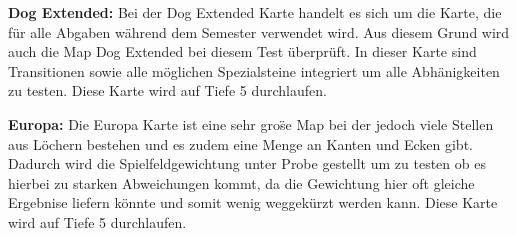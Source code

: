 \textbf{Dog Extended:}
Bei der Dog Extended Karte handelt es sich um die Karte, die f\"ur alle Abgaben w\"ahrend dem Semester verwendet wird.
Aus diesem Grund wird auch die Map Dog Extended bei diesem Test \"uberpr\"uft.
In dieser Karte sind Transitionen sowie alle m\"oglichen Spezialsteine integriert um alle Abh\"anigkeiten zu testen.
Diese Karte wird auf Tiefe 5 durchlaufen.

\textbf{Europa:}
Die Europa Karte ist eine sehr gro\"se Map bei der jedoch viele Stellen aus L\"ochern bestehen und es zudem eine Menge an Kanten und Ecken gibt.
Dadurch wird die Spielfeldgewichtung unter Probe gestellt um zu testen ob es hierbei zu starken Abweichungen kommt, da die Gewichtung hier oft gleiche Ergebnise liefern k\"onnte und somit wenig weggek\"urzt werden kann.
Diese Karte wird auf Tiefe 5 durchlaufen.

\bigskip
\newpage